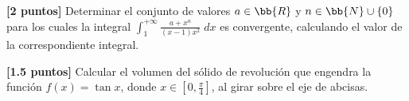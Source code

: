 \documentclass[12pt]{article}
\begin{document}
\begin{ejercicio}\textbf{[2 puntos]}
    Determinar el conjunto de valores $a\in \bb{R}$ y $n\in \bb{N}\cup \{0\}$ para los cuales la integral $\displaystyle \int_1^{+\infty} \frac{a+x^n}{(x-1)x^2}\;dx$ es convergente, calculando el valor de la correspondiente integral.
\end{ejercicio}

\begin{ejercicio}\textbf{[1.5 puntos]}
    Calcular el volumen del sólido de revolución que engendra la función $f(x)=\tan x$, donde $x\in \left[0,\frac{\pi}{4}\right]$, al girar sobre el eje de abcisas.
\end{ejercicio}
\end{document}
